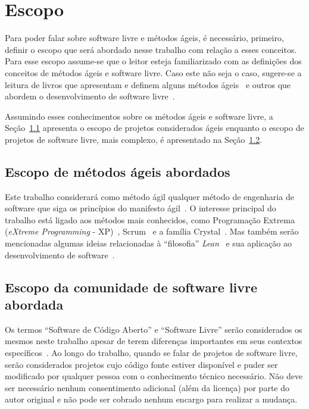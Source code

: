 \chapter{Escopo}
\label{cap:escopo}

Para poder falar sobre software livre e métodos ágeis, é necessário,
primeiro, definir o escopo que será abordado nesse trabalho com
relação a esses conceitos. Para esse escopo assume-se que o leitor
esteja familiarizado com as definições dos conceitos de métodos ágeis
e software livre. Caso este não seja o caso, sugere-se a leitura de
livros que apresentam e definem alguns métodos
ágeis~\cite{XP01,Cockburn2002,Schwaber2004} e outros que abordem o
desenvolvimento de software
livre~\cite{Raymond1999,Fogel2005,Goldman2005}.

Assumindo esses conhecimentos sobre os métodos ágeis e software livre,
a Seção~\ref{sec:agile-def} apresenta o escopo de projetos
considerados ágeis enquanto o escopo de projetos de software livre,
mais complexo, é apresentado na Seção~\ref{sec:os-def}.

\section{Escopo de métodos ágeis abordados}
\label{sec:agile-def}

Este trabalho considerará como método ágil qualquer método de
engenharia de software que siga os princípios do manifesto
ágil~\cite{AgileManifesto}. O interesse principal do trabalho está
ligado aos métodos mais conhecidos, como Programação Extrema
(\emph{eXtreme Programming} - XP)~\cite{XP02},
Scrum~\cite{Schwaber2004} e a família Crystal~\cite{Cockburn2002}. Mas
também serão mencionadas algumas ideias relacionadas à ``filosofia''
\emph{Lean}~\cite{Ohno1998} e sua aplicação ao desenvolvimento de
software~\cite{Poppendieck2005}.

\section{Escopo da comunidade de software livre abordada}
\label{sec:os-def}

Os termos ``Software de Código Aberto'' e ``Software Livre'' serão
considerados os mesmos neste trabalho apesar de terem diferenças
importantes em seus contextos específicos~\cite[Ch. 1, Free Versus
Open source]{Fogel2005}. Ao longo do trabalho, quando se falar de
projetos de software livre, serão considerados projetos cujo código
fonte estiver disponível e puder ser modificado por qualquer pessoa
com o conhecimento técnico necessário. Não deve ser necessário nenhum
consentimento adicional (além da licença) por parte do autor original
e não pode ser cobrado nenhum encargo para realizar a mudança.

